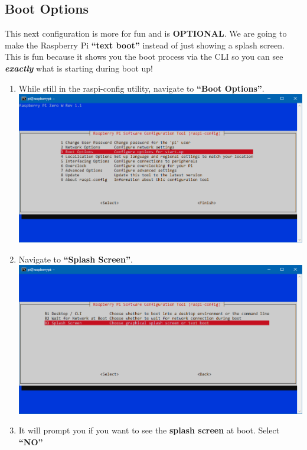 \documentclass{article}
\begin{document}
\subsection{Boot Options}

This next configuration is more for fun and is \textbf{OPTIONAL}. We are going to make the Raspberry Pi \textbf{``text boot''} instead of just showing a splash screen. This is fun because it shows you the boot process via the CLI so you can see \textbf{\textit{exactly}} what is starting during boot up!

\begin{enumerate}
  \item While still in the raspi-config utility, navigate to \textbf{``Boot Options''}.
  \newline
  \newline
  \includegraphics[width=1.00\textwidth]{rcboot}
  \item Navigate to \textbf{``Splash Screen''}.
  \newline
  \newline
  \includegraphics[width=1.00\textwidth]{rcboottext}
  \item It will prompt you if you want to see the \textbf{splash screen} at boot. Select \textbf{``NO''}

\end{enumerate}
\end{document}
